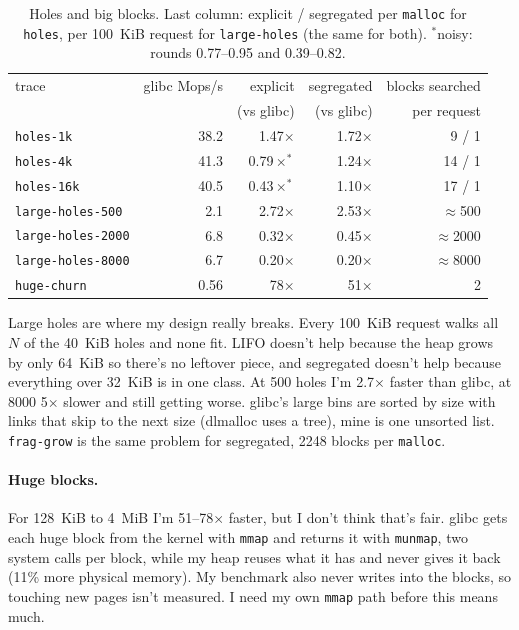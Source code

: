 \documentclass[11pt,letterpaper]{article}
\begin{document}
\begin{table}[H]
\centering
\footnotesize
\begin{tabular}{@{}l r r r r@{}}
\toprule
trace & glibc Mops/s & explicit & segregated & blocks searched \\
 & & (vs glibc) & (vs glibc) & per request \\
\midrule
\texttt{holes-1k}  & 38.2 & 1.47$\times$ & 1.72$\times$ & 9 / 1 \\
\texttt{holes-4k}  & 41.3 & 0.79$\times^\ast$ & 1.24$\times$ & 14 / 1 \\
\texttt{holes-16k} & 40.5 & 0.43$\times^\ast$ & 1.10$\times$ & 17 / 1 \\
\midrule
\texttt{large-holes-500}  & 2.1 & 2.72$\times$ & 2.53$\times$ & $\approx$500 \\
\texttt{large-holes-2000} & 6.8 & 0.32$\times$ & 0.45$\times$ & $\approx$2000 \\
\texttt{large-holes-8000} & 6.7 & 0.20$\times$ & 0.20$\times$ & $\approx$8000 \\
\midrule
\texttt{huge-churn} & 0.56 & 78$\times$ & 51$\times$ & 2 \\
\bottomrule
\end{tabular}
\caption{Holes and big blocks. Last column: explicit / segregated per \texttt{malloc} for \texttt{holes}, per 100~KiB request for \texttt{large-holes} (the same for both). $^\ast$noisy: rounds 0.77--0.95 and 0.39--0.82.}
\label{tab:stress}
\end{table}

Large holes are where my design really breaks. Every 100~KiB request walks all $N$ of the 40~KiB holes and none fit. LIFO doesn't help because the heap grows by only 64~KiB so there's no leftover piece, and segregated doesn't help because everything over 32~KiB is in one class. At 500 holes I'm 2.7$\times$ faster than glibc, at 8000 5$\times$ slower and still getting worse. glibc's large bins are sorted by size with links that skip to the next size (dlmalloc uses a tree), mine is one unsorted list. \texttt{frag-grow} is the same problem for segregated, 2248 blocks per \texttt{malloc}.

\paragraph{Huge blocks.} For 128~KiB to 4~MiB I'm 51--78$\times$ faster, but I don't think that's fair. glibc gets each huge block from the kernel with \texttt{mmap} and returns it with \texttt{munmap}, two system calls per block, while my heap reuses what it has and never gives it back (11\% more physical memory). My benchmark also never writes into the blocks, so touching new pages isn't measured. I need my own \texttt{mmap} path before this means much.
\end{document}
